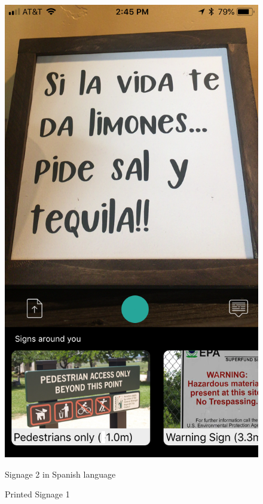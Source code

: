 \documentclass[12pt]{article}
\begin{document}
 \begin{figure} [H]
\centering
\begin{minipage}{.5\textwidth}
  \centering
  \includegraphics[width=0.9\linewidth]{media/case4.png}
  \caption{Printed Signage 1}{Signage 2 in Spanish language}
  \label{fig:case4in}
\end{minipage}%
\begin{minipage}{.5\textwidth}
  \centering

\end{minipage}
\end{figure}
\end{document}
